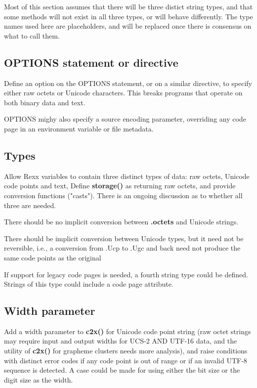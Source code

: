 \documentclass[b4paper]{article}
\begin{document}
Most of this section assumes that there will be three distict string
types, and that some methods will not exist in all three types, or
will behave differently.
The type names used here are placeholders, and will be replaced once
there is consensus on what to call them.

\subsection{\textbf{OPTIONS} statement or directive}

Define an option on the OPTIONS statement, or on a similar directive,
to specify either raw octets or Unicode characters.
This breaks programs that operate on both binary data and text.

OPTIONS mighy also specify a source encoding parameter, overriding any code page in an environment variable or file metadata.

\subsection{Types}

Allow Rexx variables to contain three distinct types of data: raw octets, Unicode code points and text,
Define \textbf{storage()} as returning raw octets,
and provide conversion functions ("casts").
There is an ongoing discussion as to whether all three are needed.

There should be no implicit conversion between \textbf{.octets} and Unicode strings.

There should be implicit conversion between Unicode types, but it need not be reversible, i.e.,
a conversion from .Ucp to .Ugc and back need not produce the same code points as the original

If support for legacy code pages is needed, a fourth string type could be defined.
Strings of this type could include a code page attribute.

\subsection{Width parameter}

Add a width parameter to \textbf{c2x()} for Unicode code point string
(raw octet strings may require input and output widths for UCS-2 AND UTF-16 data, and the
utility of \textbf{c2x()} for grapheme clusters needs more
analysis), and raise conditions with distinct error codes if any code
point is out of range or if an invalid UTF-8 sequence is detected.  A
case could be made for using either the bit size or the digit size as
the width.
\end{document}
